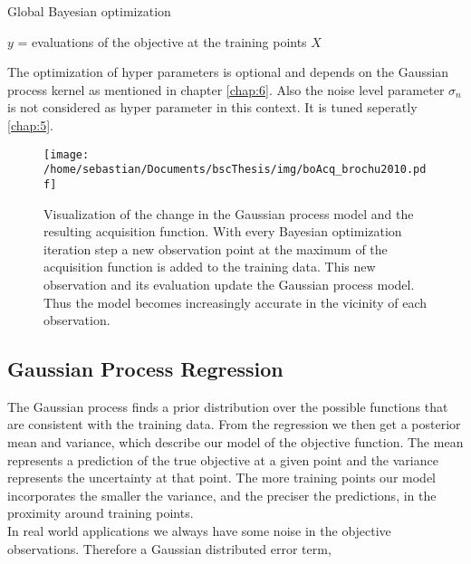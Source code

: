 \begin{algorithm}
    \caption{Global Bayesian optimization\label{alg:boGlob}}
    \BlankLine

    $y$ = evaluations of the objective at the training points $X$\\
\end{algorithm}

The optimization of hyper parameters is optional and depends on the Gaussian process kernel as mentioned in chapter \ref{chap:6}. Also the noise level parameter $\sigma_n$ is not considered as hyper parameter in this context. It is tuned seperatly \ref{chap:5}.

\begin{figure}[h]
    \centering
    \texttt{[image: /home/sebastian/Documents/bscThesis/img/boAcq\_brochu2010.pdf]}
    \caption{Visualization of the change in the Gaussian process model and the resulting acquisition function. With every Bayesian optimization iteration step a new observation point at the maximum of the acquisition function is added to the training data. This new observation and its evaluation update the Gaussian process model. Thus the model becomes increasingly accurate in the vicinity of each observation. \cite{brochu2010tutorial} \label{fig:acqBO}}
\end{figure}

\subsection{Gaussian Process Regression}
The Gaussian process finds a prior distribution over the possible functions that are consistent with the training data. From the regression we then get a posterior mean and variance, which describe our model of the objective function. The mean represents a prediction of the true objective at a given point and the variance represents the uncertainty at that point. The more training points our model incorporates the smaller the variance, and the preciser the predictions, in the proximity around training points.\\
In real world applications we always have some noise in the objective observations. Therefore a Gaussian distributed error term,

